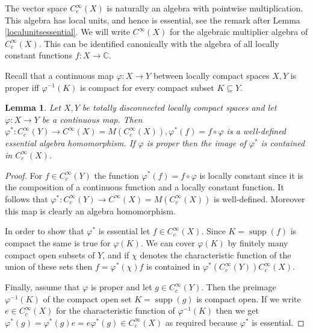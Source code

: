 \documentclass{amsart}
\newtheorem{lemma}[thm]{Lemma}
\newcommand{\ccinfty}{C_c^\infty}
\begin{document}
The vector space $ \ccinfty(X) $ is naturally an algebra with pointwise multiplication. This algebra has local units, 
and hence is essential, see the remark after Lemma \ref{localunitsessential}. We will write $ C^\infty(X) $ for the algebraic multiplier algebra of $ \ccinfty(X) $. This can be identified canonically with the algebra of all locally constant functions $ f: X \rightarrow \mathbb{C} $. 

Recall that a continuous map $ \varphi: X \rightarrow Y $ between locally compact spaces $ X, Y $ is proper iff $ \varphi^{-1}(K) $ is compact for every compact subset $ K \subseteq Y $. 

\begin{lemma} \label{lemma: non degeneracy module structure at level of functions}
Let $ X, Y $ be totally disconnected locally compact spaces and let $ \varphi: X \rightarrow Y $ be a continuous map. Then $ \varphi^*: \ccinfty(Y) \rightarrow C^\infty(X) = M(\ccinfty(X)), \varphi^*(f) = f \circ \varphi $ is a well-defined essential algebra homomorphism. If $ \varphi $ is proper then the image of $ \varphi^* $ is contained in $ \ccinfty(X) $. 
\end{lemma}

\begin{proof}
For $ f \in \ccinfty(Y) $ the function $ \varphi^*(f) = f \circ \varphi $ is locally constant since it is the composition of a continuous function and a locally constant function. It follows that $ \varphi^*: \ccinfty(Y) \rightarrow C^\infty(X) = M(\ccinfty(X)) $ is well-defined. Moreover this map is clearly an algebra homomorphism. 

In order to show that $ \varphi^* $ is essential let $ f \in \ccinfty(X) $. Since $ K = \operatorname{supp}(f) $ is compact the same is true for $ \varphi(K) $. We can 
cover $ \varphi(K) $ by finitely many compact open subsets of $ Y $, and if $ \chi $ denotes the characteristic function of the union of these sets then $ f = \varphi^*(\chi)f $ 
is contained in $ \varphi^*(\ccinfty(Y)) \ccinfty(X) $. 

Finally, assume that $ \varphi $ is proper and let $ g \in \ccinfty(Y) $. Then the preimage $ \varphi^{-1}(K) $ of the compact open set $ K = \operatorname{supp}(g) $ is compact open. If we write $ e \in \ccinfty(X) $ for the characteristic function of $ \varphi^{-1}(K) $ then we get $ \varphi^*(g) = \varphi^*(g) e = e \varphi^*(g) \in \ccinfty(X) $ as required because $ \varphi^* $ is essential. 
\end{proof}
\end{document}
